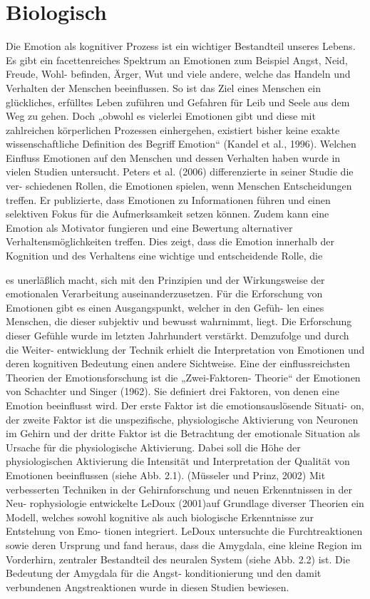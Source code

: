 \section{Biologisch}
Die Emotion als kognitiver Prozess ist ein wichtiger Bestandteil unseres Lebens. Es gibt
ein facettenreiches Spektrum an Emotionen zum Beispiel Angst, Neid, Freude, Wohl-
befinden, Ärger, Wut und viele andere, welche das Handeln und Verhalten der Menschen
beeinflussen. So ist das Ziel eines Menschen ein glückliches, erfülltes Leben zuführen und
Gefahren für Leib und Seele aus dem Weg zu gehen. Doch „obwohl es vielerlei Emotionen
gibt und diese mit zahlreichen körperlichen Prozessen einhergehen, existiert bisher keine
exakte wissenschaftliche Definition des Begriff Emotion“ (Kandel et al., 1996).
Welchen Einfluss Emotionen auf den Menschen und dessen Verhalten haben wurde in
vielen Studien untersucht. Peters et al. (2006) differenzierte in seiner Studie die ver-
schiedenen Rollen, die Emotionen spielen, wenn Menschen Entscheidungen treffen. Er
publizierte, dass Emotionen zu Informationen führen und einen selektiven Fokus für die
Aufmerksamkeit setzen können. Zudem kann eine Emotion als Motivator fungieren und
eine Bewertung alternativer Verhaltensmöglichkeiten treffen. Dies zeigt, dass die Emotion
innerhalb der Kognition und des Verhaltens eine wichtige und entscheidende Rolle, die


es unerläßlich macht, sich mit den Prinzipien und der Wirkungsweise der emotionalen
Verarbeitung auseinanderzusetzen.
Für die Erforschung von Emotionen gibt es einen Ausgangspunkt, welcher in den Gefüh-
len eines Menschen, die dieser subjektiv und bewusst wahrnimmt, liegt. Die Erforschung
dieser Gefühle wurde im letzten Jahrhundert verstärkt. Demzufolge und durch die Weiter-
entwicklung der Technik erhielt die Interpretation von Emotionen und deren kognitiven
Bedeutung einen andere Sichtweise.
Eine der einflussreichsten Theorien der Emotionsforschung ist die „Zwei-Faktoren-
Theorie“ der Emotionen von Schachter und Singer (1962). Sie definiert drei Faktoren, von
denen eine Emotion beeinflusst wird. Der erste Faktor ist die emotionsauslösende Situati-
on, der zweite Faktor ist die unspezifische, physiologische Aktivierung von Neuronen im
Gehirn und der dritte Faktor ist die Betrachtung der emotionale Situation als Ursache für
die physiologische Aktivierung. Dabei soll die Höhe der physiologischen Aktivierung die
Intensität und Interpretation der Qualität von Emotionen beeinflussen (siehe Abb. 2.1).
(Müsseler und Prinz, 2002)
Mit verbesserten Techniken in der Gehirnforschung und neuen Erkenntnissen in der Neu-
rophysiologie entwickelte LeDoux (2001)auf Grundlage diverser Theorien ein Modell,
welches sowohl kognitive als auch biologische Erkenntnisse zur Entstehung von Emo-
tionen integriert. LeDoux untersuchte die Furchtreaktionen sowie deren Ursprung und
fand heraus, dass die Amygdala, eine kleine Region im Vorderhirn, zentraler Bestandteil
des neuralen System (siehe Abb. 2.2) ist. Die Bedeutung der Amygdala für die Angst-
konditionierung und den damit verbundenen Angstreaktionen wurde in diesen Studien
bewiesen.

